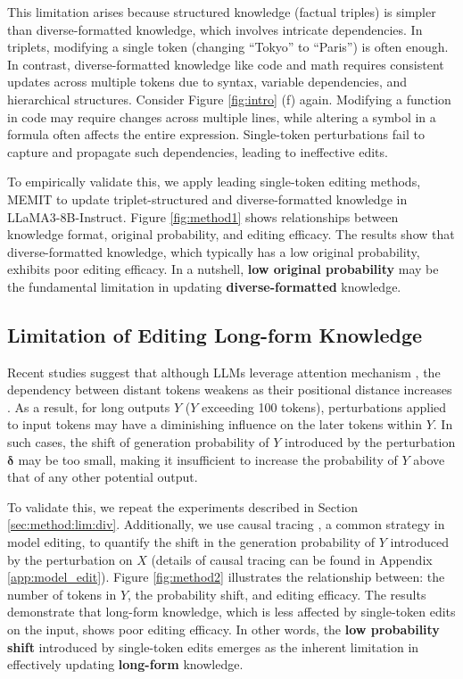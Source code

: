 This limitation arises because structured knowledge (\eg factual triples) is simpler than diverse-formatted knowledge, which involves intricate dependencies. In triplets, modifying a single token (\eg changing ``Tokyo'' to ``Paris'') is often enough. In contrast, diverse-formatted knowledge like code and math requires consistent updates across multiple tokens due to syntax, variable dependencies, and hierarchical structures. Consider Figure \ref{fig:intro} (f) again. Modifying a function in code may require changes across multiple lines, while altering a symbol in a formula often affects the entire expression. Single-token perturbations fail to capture and propagate such dependencies, leading to ineffective edits.

To empirically validate this, we apply leading single-token editing methods, MEMIT to update triplet-structured and diverse-formatted knowledge in LLaMA3-8B-Instruct. Figure \ref{fig:method1} shows relationships between knowledge format, original probability, and editing efficacy. The results show that diverse-formatted knowledge, which typically has a low original probability, exhibits poor editing efficacy. In a nutshell, \textbf{low original probability} may be the fundamental limitation in updating \textbf{diverse-formatted} knowledge.

\subsection{Limitation of Editing Long-form Knowledge} \label{sec:method:lim:lon}

Recent studies suggest that although LLMs leverage attention mechanism \cite{gpt-j}, the dependency between distant tokens weakens as their positional distance increases \cite{long_form}. As a result, for long outputs $Y$ (\eg $Y$ exceeding 100 tokens), perturbations applied to input tokens may have a diminishing influence on the later tokens within $Y$. In such cases, the shift of generation probability of $Y$ introduced by the perturbation $\bm{\delta}$ may be too small, making it insufficient to increase the probability of $Y$ above that of any other potential output.

To validate this, we repeat the experiments described in Section \ref{sec:method:lim:div}. Additionally, we use causal tracing \cite{ROME}, a common strategy in model editing, to quantify the shift in the generation probability of $Y$ introduced by the perturbation on $X$ (details of causal tracing can be found in Appendix \ref{app:model_edit}).
Figure \ref{fig:method2} illustrates the relationship between: the number of tokens in $Y$, the probability shift, and editing efficacy.
The results demonstrate that long-form knowledge, which is less affected by single-token edits on the input, shows poor editing efficacy. In other words, the \textbf{low probability shift} introduced by single-token edits emerges as the inherent limitation in effectively updating \textbf{long-form} knowledge.

